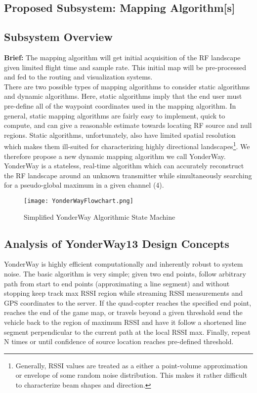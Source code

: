 \documentclass[11pt,letterpaper,titlepage]{article}
\begin{document}
\begin{onehalfspace}
\pagebreak
\section{Proposed Subsystem: Mapping Algorithm[s]}
\subsection{Subsystem Overview}
\textbf{Brief:} The mapping algorithm will get initial acquisition of the RF landscape given limited flight time and sample rate. This initial map will be pre-processed and fed to the routing and visualization systems.\\

\noindent 
There are two possible types of mapping algorithms to consider\- static algorithms and dynamic algorithms. Here, static algorithms imply that the end user must pre-define all of the waypoint coordinates used in the mapping algorithm. In general, static mapping algorithms are fairly easy to implement, quick to compute, and can give a reasonable estimate towards locating RF source and null regions. Static algorithms, unfortunately, also have limited spatial resolution which makes them ill-suited for characterizing highly directional landscapes\footnote{Generally, RSSI values are treated as a either a point-volume approximation or envelope of some random noise distribution. This makes it rather difficult to characterize beam shapes and direction.}. We therefore propose a new dynamic mapping algorithm we call YonderWay. YonderWay is a stateless, real-time algorithm which can accurately reconstruct the RF landscape around an unknown transmitter while simultaneously searching for a pseudo-global maximum in a given channel (4).

\begin{wrapfigure}{r}{0.55\textwidth}
\centering
\texttt{[image: YonderWayFlowchart.png]}
\caption{Simplified YonderWay Algorithmic State Machine}
\end{wrapfigure}

\subsection{Analysis of YonderWay13 Design Concepts}

YonderWay is highly efficient computationally and inherently robust to system noise. The basic algorithm is very simple; given two end points, follow arbitrary path from start to end points (approximating a line segment) and without stopping keep track max RSSI region while streaming RSSI measurements and GPS coordinates to the server. If the quad-copter reaches the specified end point, reaches the end of the game map, or travels beyond a given threshold send the vehicle back to the region of maximum RSSI and have it follow a shortened line segment perpendicular to the current path at the local RSSI max. Finally, repeat N times or until confidence of source location reaches pre-defined threshold.\\


\end{onehalfspace}
\end{document}

